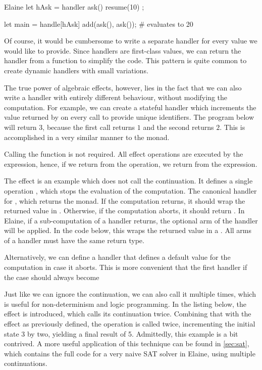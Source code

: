 \begin{lst}{Elaine}
let hAsk = handler { ask() { resume(10) } };

let main = handle[hAsk] add(ask(), ask()); # evaluates to 20
\end{lst}
%
Of course, it would be cumbersome to write a separate handler for every value we would like to provide. Since handlers are first-class values, we can return the handler from a function to simplify the code. This pattern is quite common to create dynamic handlers with small variations.


The true power of algebraic effects, however, lies in the fact that we can also write a handler with entirely different behaviour, without modifying the computation. For example, we can create a stateful handler which increments the value returned by  on every call to provide unique identifiers. The program below will return $3$, because the first  call returns $1$ and the second returns $2$. This is accomplished in a very similar manner to the  monad.


Calling the  function is not required. All effect operations are executed by the  expression, hence, if we return from the operation, we return from the  expression.

The  effect is an example which does not call the continuation. It defines a single operation , which stops the evaluation of the computation. The canonical handler for , which returns the  monad. If the computation returns, it should wrap the returned value in . Otherwise, if the computation aborts, it should return . In Elaine, if a sub-computation of a handler returns, the optional  arm of the handler will be applied. In the code below, this wraps the returned value in a . All arms of a handler must have the same return type.


Alternatively, we can define a handler that defines a default value for the computation in case it aborts. This is more convenient that the first handler if the  case should always become


Just like we can ignore the continuation, we can also call it multiple times, which is useful for non-determinism and logic programming. In the listing below, the  effect is introduced, which calls its continuation twice. Combining that with the  effect as previously defined, the  operation is called twice, incrementing the initial state 3 by two, yielding a final result of 5. Admittedly, this example is a bit contrived. A more useful application of this technique can be found in \cref{sec:sat}, which contains the full code for a very naive SAT solver in Elaine, using multiple continuations.

